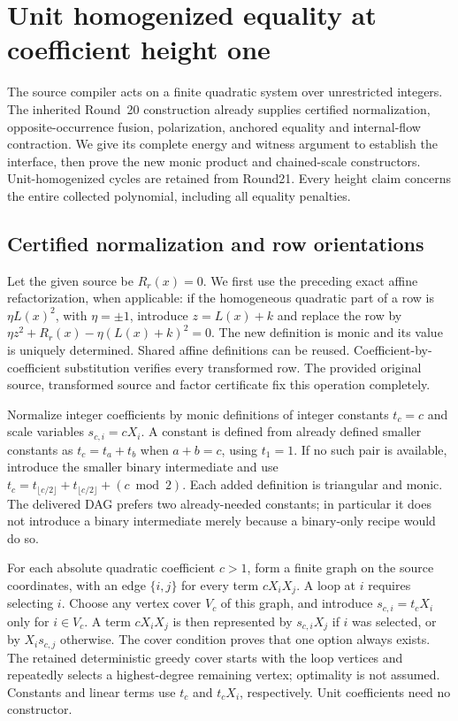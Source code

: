 \section{Unit homogenized equality at coefficient height one}
\label{sec:signed-network}
The source compiler acts on a finite quadratic system over unrestricted
integers. The inherited Round~20 construction already supplies certified
normalization, opposite-occurrence fusion, polarization, anchored equality
and internal-flow contraction. We give its complete energy and witness
argument to establish the interface, then prove the new monic product and chained-scale
constructors. Unit-homogenized cycles are retained from Round21. Every height claim concerns the entire collected
polynomial, including all equality penalties.

\subsection{Certified normalization and row orientations}
Let the given source be $R_r(x)=0$. We first use the preceding exact affine
refactorization, when applicable: if the homogeneous quadratic part of a
row is $\eta L(x)^2$, with $\eta=\pm1$, introduce $z=L(x)+k$ and replace
the row by $\eta z^2+R_r(x)-\eta(L(x)+k)^2=0$. The new definition is monic
and its value is uniquely determined. Shared affine definitions can be
reused. Coefficient-by-coefficient substitution verifies every transformed
row. The provided original source, transformed source and factor
certificate fix this operation completely.

Normalize integer coefficients by monic definitions of integer constants
$t_c=c$ and scale variables $s_{c,i}=cX_i$. A constant is defined from
already defined smaller constants as $t_c=t_a+t_b$ when $a+b=c$, using
$t_1=1$. If no such pair is available, introduce the smaller binary
intermediate and use
$t_c=t_{\lfloor c/2\rfloor}+t_{\lfloor c/2\rfloor}+(c\bmod2)$.
Each added definition is triangular and monic. The delivered DAG prefers
two already-needed constants; in particular it does not introduce a
binary intermediate merely because a binary-only recipe would do so.

For each absolute quadratic coefficient $c>1$, form a finite graph on the
source coordinates, with an edge $\{i,j\}$ for every term $cX_iX_j$.
A loop at $i$ requires selecting $i$. Choose any vertex cover $V_c$ of
this graph, and introduce $s_{c,i}=t_cX_i$ only for $i\in V_c$. A term
$cX_iX_j$ is then represented by $s_{c,i}X_j$ if $i$ was selected, or by
$X_is_{c,j}$ otherwise. The cover condition proves that one option always
exists. The retained deterministic greedy cover starts with the loop
vertices and repeatedly selects a highest-degree remaining vertex;
optimality is not assumed. Constants and linear terms use $t_c$ and
$t_cX_i$, respectively. Unit coefficients need no constructor.

